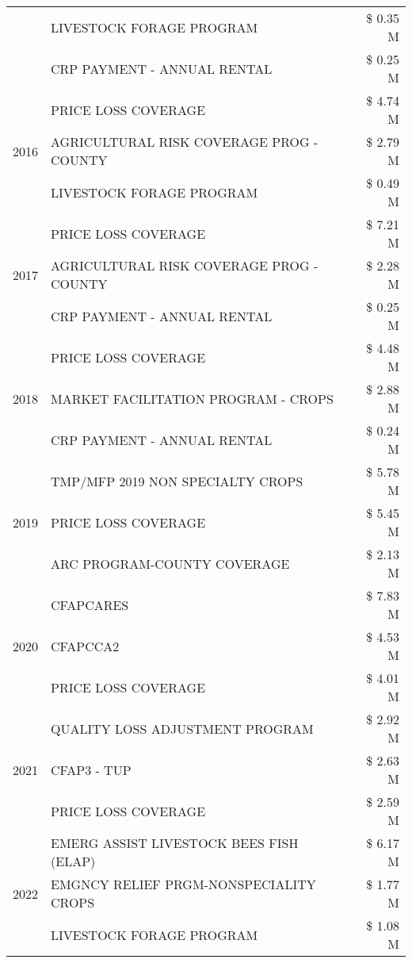 \begin{tabular}{llr}
 & LIVESTOCK FORAGE PROGRAM & \$ 0.35 M \\
 & CRP PAYMENT - ANNUAL RENTAL & \$ 0.25 M \\
\cline{1-3}
\multirow[t]{3}{*}{2016} & PRICE LOSS COVERAGE & \$ 4.74 M \\
 & AGRICULTURAL RISK COVERAGE PROG - COUNTY & \$ 2.79 M \\
 & LIVESTOCK FORAGE PROGRAM & \$ 0.49 M \\
\cline{1-3}
\multirow[t]{3}{*}{2017} & PRICE LOSS COVERAGE & \$ 7.21 M \\
 & AGRICULTURAL RISK COVERAGE PROG - COUNTY & \$ 2.28 M \\
 & CRP PAYMENT - ANNUAL RENTAL & \$ 0.25 M \\
\cline{1-3}
\multirow[t]{3}{*}{2018} & PRICE LOSS COVERAGE & \$ 4.48 M \\
 & MARKET FACILITATION PROGRAM - CROPS & \$ 2.88 M \\
 & CRP PAYMENT - ANNUAL RENTAL & \$ 0.24 M \\
\cline{1-3}
\multirow[t]{3}{*}{2019} & TMP/MFP 2019 NON SPECIALTY CROPS & \$ 5.78 M \\
 & PRICE LOSS COVERAGE & \$ 5.45 M \\
 & ARC PROGRAM-COUNTY COVERAGE & \$ 2.13 M \\
\cline{1-3}
\multirow[t]{3}{*}{2020} & CFAPCARES & \$ 7.83 M \\
 & CFAPCCA2 & \$ 4.53 M \\
 & PRICE LOSS COVERAGE & \$ 4.01 M \\
\cline{1-3}
\multirow[t]{3}{*}{2021} & QUALITY LOSS ADJUSTMENT PROGRAM & \$ 2.92 M \\
 & CFAP3 - TUP & \$ 2.63 M \\
 & PRICE LOSS COVERAGE & \$ 2.59 M \\
\cline{1-3}
\multirow[t]{3}{*}{2022} & EMERG ASSIST LIVESTOCK BEES FISH (ELAP) & \$ 6.17 M \\
 & EMGNCY RELIEF PRGM-NONSPECIALITY CROPS & \$ 1.77 M \\
 & LIVESTOCK FORAGE PROGRAM & \$ 1.08 M \\
\cline{1-3}
\bottomrule
\end{tabular}
